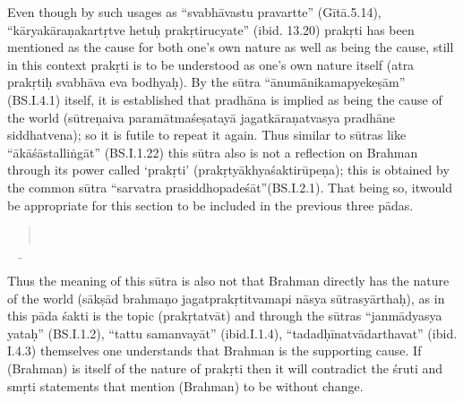 Even though by such usages as “svabhāvastu pravartte” (Gītā.5.14), “kāryakāraṇakartṛtve hetuḥ prakṛtirucyate” (ibid. 13.20) prakṛti has been mentioned as the cause for both one’s own nature as well as being the cause, still in this context prakṛti is to be understood as  one’s own nature itself (atra prakṛtiḥ svabhāva eva bodhyaḥ). By the sūtra “ānumā\-nikamapyekeṣām” (BS.I.4.1) itself, it is established that pradhāna is implied as being the cause of the world (sūtreṇaiva paramātmaśeṣatayā jagatkāraṇatvasya pradhāne siddhatvena); so it is futile to repeat it again.  Thus similar to sūtras like “ākāśāstalliṅgāt” (BS.I.1.22) this sūtra also is not a reflection on Brahman through its power called ‘prakṛti’ (prakṛtyākhyaśaktirūpeṇa); this is obtained by the common sūtra “sarvatra prasiddhopadeśāt”(BS.I.2.1). That being so, it\break would be appropriate for this section to be included in the previous three pādas.



\begin{verse}
\\
\end{verse}


 $\underline{\qquad}$

Thus the meaning of this sūtra is also not that Brahman directly has the nature of the world (sākṣād brahmaṇo jagatprakṛtitvamapi nāsya sūtrasyārthaḥ), as in this pāda śakti is the topic (prakṛtatvāt) and through the sūtras “janmādyasya yataḥ” (BS.I.1.2), “tattu samanvayāt” (ibid.I.1.4), “tadadḥīnatvādarthavat” (ibid. I.4.3) themselves one understands that Brahman is the supporting cause. If (Brahman) is itself of the nature of prakṛti then it will contradict the śruti and smṛti statements that mention (Brahman) to be without change.

